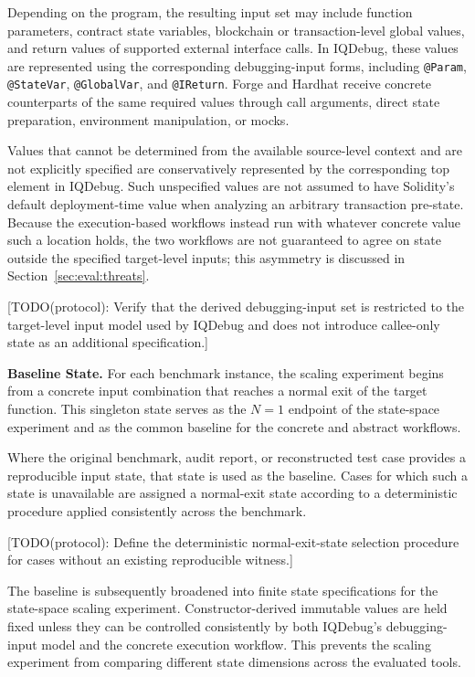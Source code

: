 \documentclass[11pt,oneside]{report}
\theoremstyle{plain}
\theoremstyle{definition}
\theoremstyle{remark}
\begin{document}
Depending on the program, the resulting input set may include function parameters, contract state variables, blockchain or transaction-level global values, and return values of supported external interface calls. In IQDebug, these values are represented using the corresponding debugging-input forms, including \texttt{@Param}, \texttt{@StateVar}, \texttt{@GlobalVar}, and \texttt{@IReturn}. Forge and Hardhat receive concrete counterparts of the same required values through call arguments, direct state preparation, environment manipulation, or mocks.

Values that cannot be determined from the available source-level context and are not explicitly specified are conservatively represented by the corresponding top element in IQDebug. Such unspecified values are not assumed to have Solidity's default deployment-time value when analyzing an arbitrary transaction pre-state. Because the execution-based workflows instead run with whatever concrete value such a location holds, the two workflows are not guaranteed to agree on state outside the specified target-level inputs; this asymmetry is discussed in Section~\ref{sec:eval:threats}.

[TODO(protocol): Verify that the derived debugging-input set is restricted to the target-level input model used by IQDebug and does not introduce callee-only state as an additional specification.]

\medskip
\noindent\textbf{Baseline State.}
For each benchmark instance, the scaling experiment begins from a concrete input combination that reaches a normal exit of the target function. This singleton state serves as the \(N=1\) endpoint of the state-space experiment and as the common baseline for the concrete and abstract workflows.

Where the original benchmark, audit report, or reconstructed test case provides a reproducible input state, that state is used as the baseline. Cases for which such a state is unavailable are assigned a normal-exit state according to a deterministic procedure applied consistently across the benchmark.

[TODO(protocol): Define the deterministic normal-exit-state selection procedure for cases without an existing reproducible witness.]

The baseline is subsequently broadened into finite state specifications for the state-space scaling experiment. Constructor-derived immutable values are held fixed unless they can be controlled consistently by both IQDebug's debugging-input model and the concrete execution workflow. This prevents the scaling experiment from comparing different state dimensions across the evaluated tools.
\end{document}
